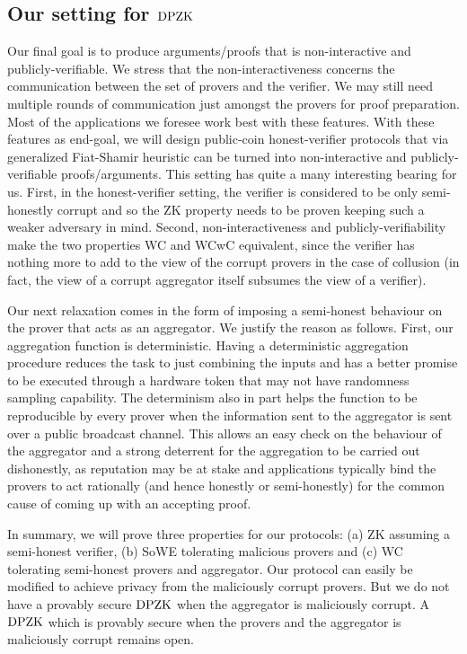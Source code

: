 \subsection{Our setting for $\text{DPZK}$}\label{subsec:our_setting}
Our final goal is to produce arguments/proofs that is non-interactive and publicly-verifiable.  We stress that the non-interactiveness concerns the communication between the set of provers and the verifier. We may still need multiple rounds of communication just amongst the provers for proof preparation.   Most of the applications we foresee work best  with these features. With these features as end-goal, we  will design public-coin honest-verifier  protocols that via generalized Fiat-Shamir heuristic \cite{FS86, BCS16} can be turned into non-interactive and publicly-verifiable proofs/arguments. This setting has quite a many interesting bearing for us. First,   in the honest-verifier setting, the verifier is considered to be only semi-honestly corrupt and so the ZK property needs to be proven keeping such a weaker adversary in mind. Second,  non-interactiveness and publicly-verifiability make the two properties WC and WCwC equivalent, since the verifier has nothing more to add to the view of the corrupt provers in the case of collusion (in fact, the view of a corrupt aggregator itself subsumes the view of a verifier). 

Our next relaxation comes in the form of imposing a semi-honest behaviour on the prover that acts as an aggregator. We justify the reason as follows.  First,  our aggregation function is deterministic. Having  a deterministic aggregation procedure reduces the task to just combining the inputs and has a better promise to be executed through a hardware token that may not have randomness sampling capability.  The determinism also in part helps the function to be reproducible by every prover  when the information sent to the aggregator is sent over a public broadcast channel. This allows an easy check on the behaviour of the aggregator and a strong deterrent for the aggregation to be carried out dishonestly, as reputation may be at stake and applications typically bind the provers to act rationally (and hence honestly or semi-honestly) for the common cause of coming up with an accepting proof.  %

In summary,  we will prove three properties for our protocols: (a) ZK assuming a
semi-honest verifier, (b)  SoWE tolerating  malicious provers and (c) WC
tolerating semi-honest provers and aggregator. Our protocol can easily be modified to achieve privacy from the maliciously corrupt provers. But we do not have a provably secure $\text{DPZK}$ when the aggregator is maliciously corrupt. A $\text{DPZK}$ which is provably secure when the provers and the aggregator is maliciously corrupt remains open. 

